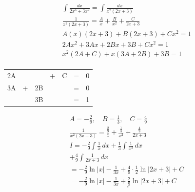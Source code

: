 \documentclass[defaultpackages]{cheatsheet}
\def\doubleunderline#1{\underline{\underline{#1}}}
\begin{document}
	\subsubsection{}
	\begin{gather*}
		\int \frac{dx}{2x^3+3x^2} = \int \frac{dx}{x^2(2x+3)}\\
		\frac{1}{x^2(2x+3)} = \frac{A}{x} + \frac{B}{x^2} + \frac{C}{2x+3}\\
		A(x)(2x+3)+B(2x+3)+Cx^2 = 1\\
		2Ax^2+3Ax+2Bx+3B+Cx^2 = 1\\
		x^2(2A+C) + x(3A+2B) + 3B = 1\\
	\end{gather*}
	\begin{tabular}{ccccccc}
		2A&&&+&C&=&0\\
		3A&+&2B&&&=&0\\
		&&3B&&&=&1
	\end{tabular}
	\begin{gather*}
		A=-\frac{2}{9},\quad B=\frac{1}{3},\quad C=\frac{4}{9}\\
		\frac{1}{x^2(2x+3)} = \frac{\frac{2}{9}}{x} + \frac{\frac{1}{3}}{x^2} + \frac{\frac{4}{9}}{2x+3}\\
		I = -\frac{2}{9}\int\frac{1}{x}\,dx + \frac{1}{3}\int \frac{1}{x^2}\,dx \\+ \frac{4}{9} \int \frac{1}{2x+3}\,dx\\
		= -\frac{2}{9}\ln|x|-\frac{1}{3x} + \frac{4}{9}\!\cdot\!\frac{1}{2}\ln|2x+3|\!+\!C\\
		=  \doubleunderline{-\frac{2}{9}\ln|x|-\frac{1}{3x} + \frac{2}{9}\ln|2x+3|+C}
	\end{gather*}
\end{document}
